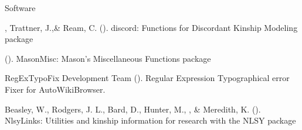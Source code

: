 \begin{rSection}{\textrm{Software}}%
\begin{etaremune}
\item\meb, Trattner, J.,\nota \& Ream, C. (\the\year). discord: Functions for Discordant Kinship Modeling \R package 
\item\meb (\the\year). MasonMisc: Mason's Miscellaneous Functions \R package 
\item RegExTypoFix Development Team (\the\year). Regular Expression Typographical error Fixer for AutoWikiBrowser. 
\item  Beasley, W., Rodgers, J. L., Bard, D., Hunter, M., \meb, \& Meredith, K. (\the\year). NlsyLinks: Utilities and kinship information for research with the NLSY \R package 
\end{etaremune}
\end{rSection}